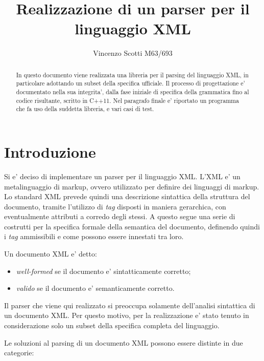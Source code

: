 \documentclass[italian,a4paper]{article}
\begin{document}
\title{Realizzazione di un parser per il linguaggio XML}
\author{Vincenzo Scotti M63/693}
\maketitle

\begin{abstract}
	In questo documento viene realizzata una libreria per il parsing del
	linguaggio XML, in particolare adottando un subset della specifica
	ufficiale. Il processo di progettazione e' documentato nella sua
	integrita', dalla fase iniziale di specifica della grammatica fino al
	codice risultante, scritto in C++11. Nel paragrafo finale e' riportato
	un programma che fa uso della suddetta libreria, e vari casi di test.
\end{abstract}

\part{Introduzione}

Si e' deciso di implementare un parser per il linguaggio XML. L'XML e' un
metalinguaggio di markup, ovvero utilizzato per definire dei linguaggi di
markup. Lo standard XML prevede quindi una descrizione sintattica della
struttura del documento, tramite l'utilizzo di \emph{tag} disposti in
maniera gerarchica, con eventualmente attributi a corredo degli stessi. A questo
segue una serie di costrutti per la specifica formale della semantica del
documento, definendo quindi i \emph{tag} ammissibili e come possono essere
innestati tra loro.

Un documento XML e' detto:

\begin{itemize}
	\item \emph{well-formed} se il documento e' sintatticamente corretto;

	\item \emph{valido} se il documento e' semanticamente corretto.
\end{itemize}

Il parser che viene qui realizzato si preoccupa solamente dell'analisi
sintattica di un documento XML. Per questo motivo, per la realizzazione e' stato
tenuto in considerazione solo un subset della specifica completa del linguaggio.

Le soluzioni al parsing di un documento XML possono essere distinte in due
categorie:
\end{document}

